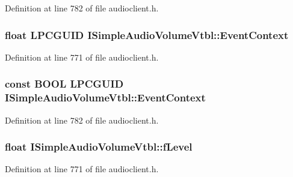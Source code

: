 Definition at line 782 of file audioclient.\+h.

\subsubsection[{\texorpdfstring{Event\+Context}{EventContext}}]{ float {\bf L\+P\+C\+G\+U\+ID} I\+Simple\+Audio\+Volume\+Vtbl\+::\+Event\+Context}\hypertarget{struct_i_simple_audio_volume_vtbl_ad5ffe5e09cd10c0c145f8b83b9b2af81}{}\label{struct_i_simple_audio_volume_vtbl_ad5ffe5e09cd10c0c145f8b83b9b2af81}


Definition at line 771 of file audioclient.\+h.

\subsubsection[{\texorpdfstring{Event\+Context}{EventContext}}]{ {\bf const} {\bf B\+O\+OL} {\bf L\+P\+C\+G\+U\+ID} I\+Simple\+Audio\+Volume\+Vtbl\+::\+Event\+Context}\hypertarget{struct_i_simple_audio_volume_vtbl_a8fa97fd6965de87b110334273eb4fbf7}{}\label{struct_i_simple_audio_volume_vtbl_a8fa97fd6965de87b110334273eb4fbf7}


Definition at line 782 of file audioclient.\+h.

\subsubsection[{\texorpdfstring{f\+Level}{fLevel}}]{ float I\+Simple\+Audio\+Volume\+Vtbl\+::f\+Level}\hypertarget{struct_i_simple_audio_volume_vtbl_a25f46aa26265c8ca1522802f3f2ba1c7}{}\label{struct_i_simple_audio_volume_vtbl_a25f46aa26265c8ca1522802f3f2ba1c7}


Definition at line 771 of file audioclient.\+h.

